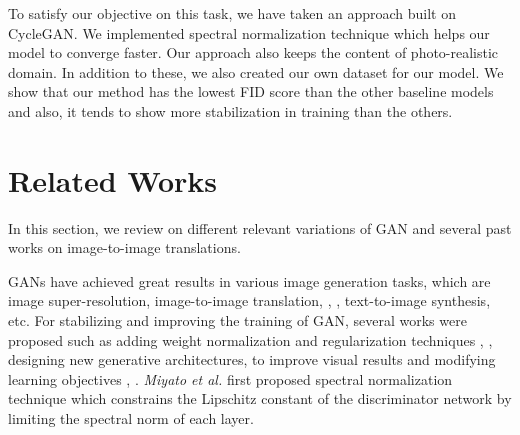 \documentclass[runningheads]{llncs}
\begin{document}
To satisfy our objective on this task, we have taken an approach built on CycleGAN\cite{DBLP:conf/iccv/ZhuPIE17}. We implemented spectral normalization technique\cite{DBLP:journals/corr/abs-1802-05957} which helps our model to converge faster. Our approach also keeps the content of photo-realistic domain. In addition to these, we also created our own dataset for our model.
We show that our method has the {lowest FID score than the other baseline models and also, it tends to show more stabilization in training than the others}.

\section{Related Works} \label{sec:rel}
In this section, we review on different relevant variations of GAN and several past works on image-to-image translations.

GANs have achieved great results in various image generation tasks, which are image super-resolution\cite{DBLP:journals/corr/JohnsonAL16}, image-to-image translation\cite{DBLP:conf/iccv/ZhuPIE17},  \cite{DBLP:journals/corr/abs-1810-04991},  \cite{DBLP:journals/corr/LiuBK17}, text-to-image synthesis\cite{DBLP:journals/corr/ZhangXLZHWM16}, \cite{DBLP:journals/corr/ReedAYLSL16} etc. For stabilizing and improving the training of GAN, several works were proposed such as adding weight normalization and regularization techniques \cite{DBLP:journals/corr/GulrajaniAADC17}, \cite{DBLP:journals/corr/abs-1802-05957}, designing new generative architectures\cite{DBLP:journals/corr/RadfordMC15}, \cite{karras2017progressive} to improve visual results and modifying learning objectives \cite{Arjovsky2017WassersteinG}, \cite{metz2016unrolled}. \textit{Miyato et al.}\cite{DBLP:journals/corr/abs-1802-05957} first proposed spectral normalization technique which constrains the Lipschitz constant of the discriminator network by limiting the spectral norm of each layer. 
\end{document}
